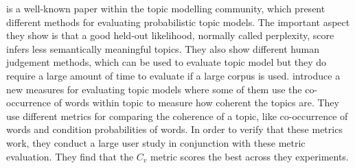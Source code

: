 \citet{tea_leaves} is a well-known paper within the topic modelling community, which present different methods for evaluating probabilistic topic models. 
The important aspect they show is that a good held-out likelihood, normally called perplexity, score infers less semantically meaningful topics.
They also show different human judgement methods, which can be used to evaluate topic model but they do require a large amount of time to evaluate if a large corpus is used.
\citet{topic_coherence_2015} introduce a new measures for evaluating topic models where some of them use the co-occurrence of words within topic to measure how coherent the topics are. 
They use different metrics for comparing the coherence of a topic, like co-occurrence of words and condition probabilities of words.
In order to verify that these metrics work, they conduct a large user study in conjunction with these metric evaluation.
They find that the $C_v$ metric scores the best across they experiments. 


